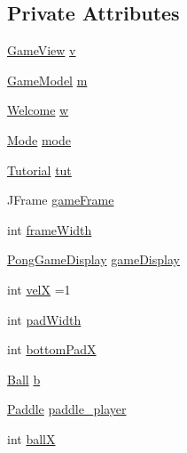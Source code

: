 \subsection*{Private Attributes}
\begin{DoxyCompactItemize}
\item 
\hyperlink{classview_1_1_game_view}{Game\+View} \hyperlink{classstart_game_1_1_game_controller_a86e3c6ba6e8d0ecb0946da48fa55e7ee}{v}
\item 
\hyperlink{classmodel_1_1_game_model}{Game\+Model} \hyperlink{classstart_game_1_1_game_controller_a2c79234f85f979b8f1efe5a48893560d}{m}
\item 
\hyperlink{classview_1_1_welcome}{Welcome} \hyperlink{classstart_game_1_1_game_controller_a5478c83b51a049015f9d4d6bc5c61607}{w}
\item 
\hyperlink{classview_1_1_mode}{Mode} \hyperlink{classstart_game_1_1_game_controller_ad46f15cbc3846c80495ca340b3b1dedc}{mode}
\item 
\hyperlink{classview_1_1_tutorial}{Tutorial} \hyperlink{classstart_game_1_1_game_controller_ae807267b0bf97687ef3c7d57e815414e}{tut}
\item 
J\+Frame \hyperlink{classstart_game_1_1_game_controller_adc48b19833b682baaa2e189362db5456}{game\+Frame}
\item 
int \hyperlink{classstart_game_1_1_game_controller_a1f16d94b3e5246eb723f9ca04aad4735}{frame\+Width}
\item 
\hyperlink{classview_1_1_pong_game_display}{Pong\+Game\+Display} \hyperlink{classstart_game_1_1_game_controller_aca62497a42166cbb72f5eafbc270afde}{game\+Display}
\item 
int \hyperlink{classstart_game_1_1_game_controller_a9de0dcbec624980f8b3808daa96ef457}{velX} =1
\item 
int \hyperlink{classstart_game_1_1_game_controller_a27e5857e2a63e94e92410f8794064db9}{pad\+Width}
\item 
int \hyperlink{classstart_game_1_1_game_controller_a9969047b4b184c3ea25eeb4ef52dfb1e}{bottom\+PadX}
\item 
\hyperlink{classmodel_1_1_ball}{Ball} \hyperlink{classstart_game_1_1_game_controller_a402855c8c84c77218045cc997a784693}{b}
\item 
\hyperlink{classmodel_1_1_paddle}{Paddle} \hyperlink{classstart_game_1_1_game_controller_a4dc3f50458dc835c6fa67be53fd1751b}{paddle\+\_\+player}
\item 
int \hyperlink{classstart_game_1_1_game_controller_a122256563a1c8df92c4c9d7549f68fd3}{ballX}
\item 

\end{DoxyCompactItemize}

